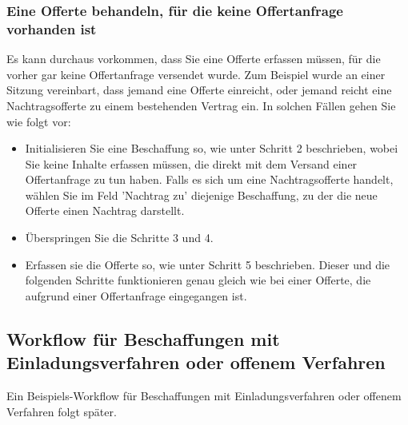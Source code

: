 \subsubsection{Eine Offerte behandeln, für die keine Offertanfrage vorhanden ist}

Es kann durchaus vorkommen, dass Sie eine Offerte erfassen müssen, für die vorher gar keine Offertanfrage versendet wurde. Zum Beispiel wurde an einer Sitzung vereinbart, dass jemand eine Offerte einreicht, oder jemand reicht eine Nachtragsofferte zu einem bestehenden Vertrag ein. In solchen Fällen gehen Sie wie folgt vor:


\begin{itemize}
\item
Initialisieren Sie eine Beschaffung so, wie unter Schritt 2 beschrieben, wobei Sie keine Inhalte erfassen müssen, die direkt mit dem Versand einer Offertanfrage zu tun haben. Falls es sich um eine Nachtragsofferte handelt, wählen Sie im Feld 'Nachtrag zu' diejenige Beschaffung, zu der die neue Offerte einen Nachtrag darstellt.
\item
Überspringen Sie die Schritte 3 und 4.
\item
Erfassen sie die Offerte so, wie unter Schritt 5 beschrieben. Dieser und die folgenden Schritte funktionieren genau gleich wie bei einer Offerte, die aufgrund einer Offertanfrage eingegangen ist.
\end{itemize}

\subsection{Workflow für Beschaffungen mit Einladungsverfahren oder offenem Verfahren}

Ein Beispiels-Workflow für Beschaffungen mit Einladungsverfahren oder offenem Verfahren folgt später.
